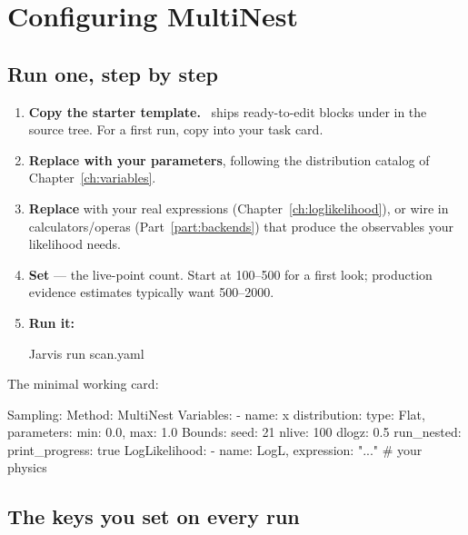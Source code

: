 \section{Configuring MultiNest}
\label{sec:multinest-yaml}

\subsection{Run one, step by step}
\label{sec:nested-run}

\begin{enumerate}
  \item \textbf{Copy the starter template.} \Jtwo\ ships ready-to-edit
         blocks under  in the
         source tree. For a first run, copy
         into your task card.
  \item \textbf{Replace  with your parameters}, following the
        distribution catalog of Chapter~\ref{ch:variables}.
  \item \textbf{Replace } with your real expressions
        (Chapter~\ref{ch:loglikelihood}), or wire in calculators/operas
        (Part~\ref{part:backends}) that produce the observables your likelihood needs.
  \item \textbf{Set } --- the live-point count. Start at
        100--500 for a first look; production evidence estimates typically want
        500--2000.
  \item \textbf{Run it:}
\begin{terminal}
\begin{jcmd}
Jarvis run scan.yaml
\end{jcmd}
\end{terminal}
\end{enumerate}

The minimal working card:

\begin{yamlwin}
Sampling:
  Method: MultiNest
  Variables:
    - name: x
      distribution: {type: Flat, parameters: {min: 0.0, max: 1.0}}
  Bounds:
    seed: 21
    nlive: 100
    dlogz: 0.5
    run_nested:
      print_progress: true
  LogLikelihood:
    - {name: LogL, expression: "..."}   # your physics
\end{yamlwin}

\subsection{The keys you set on every run}
\label{sec:nested-bounds-meta}

